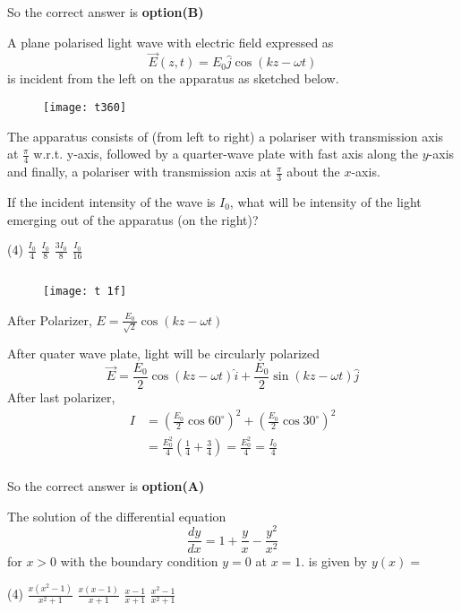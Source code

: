 \begin{questions}
\begin{answer}
	So the correct answer is \textbf{option(B)}
\end{answer}
\begin{minipage}{\textwidth}
	\question A plane polarised light wave with electric field expressed as
	$$
	\vec{E}(z, t)=E_{0} \hat{j} \cos (k z-\omega t)
	$$
	is incident from the left on the apparatus as sketched below.\\
	\begin{figure}[H]
		\centering
		\texttt{[image: t360]}
	\end{figure}
	The apparatus consists of (from left to right) a polariser with transmission axis at $\frac{\pi}{4}$ w.r.t. y-axis, followed by a quarter-wave plate with fast axis along the $y$-axis and finally, a polariser with transmission axis at $\frac{\pi}{3}$ about the $x$-axis.
	
	If the incident intensity of the wave is $I_{0}$, what will be intensity of the light emerging out of the apparatus (on the right)?
\end{minipage}
\begin{tasks}(4)
	\task[\textbf{A.}]   $\frac{I_{0}}{4}$
	\task[\textbf{B.}] $\frac{I_{0}}{8}$
	\task[\textbf{C.}]   $\frac{3 I_{0}}{8}$
	\task[\textbf{D.}]   $\frac{I_{0}}{16}$
\end{tasks}
\begin{answer}$\left. \right. $\\
	\begin{figure}[H]
		\centering
		\texttt{[image: t 1f]}
		\end{figure}
	After Polarizer, $E=\frac{E_{0}}{\sqrt{2}} \cos (k z-\omega t)$
	
	After quater wave plate, light will be circularly polarized
	$$
	\vec{E}=\frac{E_{0}}{2} \cos (k z-\omega t) \hat{i}+\frac{E_{0}}{2} \sin (k z-\omega t) \hat{j}
	$$
	After last polarizer,
	$$
	\begin{aligned}
	I &=\left(\frac{E_{0}}{2} \cos 60^{\circ}\right)^{2}+\left(\frac{E_{0}}{2} \cos 30^{\circ}\right)^{2} \\
	&=\frac{E_{0}^{2}}{4}\left(\frac{1}{4}+\frac{3}{4}\right)=\frac{E_{0}^{2}}{4}=\frac{I_{0}}{4}
	\end{aligned}
	$$\\
	So the correct answer is \textbf{option(A)}
\end{answer}
\begin{minipage}{\textwidth}
	\question The solution of the differential equation
	$$
	\frac{d y}{d x}=1+\frac{y}{x}-\frac{y^{2}}{x^{2}}
	$$
	for $x>0$ with the boundary condition $y=0$ at $x=1$. is given by $y(x)=$
\end{minipage}
\begin{tasks}(4)
	\task[\textbf{A.}] $\frac{x\left(x^{2}-1\right)}{x^{2}+1}$
	\task[\textbf{B.}]   $\frac{x(x-1)}{x+1}$
	\task[\textbf{C.}]   $\frac{x-1}{x+1}$
	\task[\textbf{D.}] $\frac{x^{2}-1}{x^{2}+1}$
\end{tasks}
\begin{answer}
	

\end{answer}
\end{questions}

